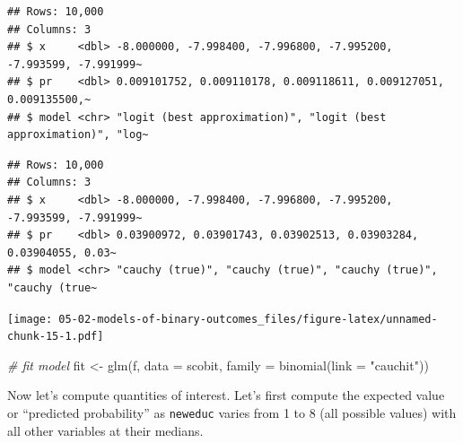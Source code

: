 \documentclass[
]{book}
\newenvironment{Shaded}{\begin{snugshade}}{\end{snugshade}}
\newcommand{\AttributeTok}[1]{\textcolor[rgb]{0.77,0.63,0.00}{#1}}
\newcommand{\CommentTok}[1]{\textcolor[rgb]{0.56,0.35,0.01}{\textit{#1}}}
\newcommand{\FunctionTok}[1]{\textcolor[rgb]{0.00,0.00,0.00}{#1}}
\newcommand{\NormalTok}[1]{#1}
\newcommand{\OtherTok}[1]{\textcolor[rgb]{0.56,0.35,0.01}{#1}}
\newcommand{\StringTok}[1]{\textcolor[rgb]{0.31,0.60,0.02}{#1}}
\begin{document}
\begin{verbatim}
## Rows: 10,000
## Columns: 3
## $ x     <dbl> -8.000000, -7.998400, -7.996800, -7.995200, -7.993599, -7.991999~
## $ pr    <dbl> 0.009101752, 0.009110178, 0.009118611, 0.009127051, 0.009135500,~
## $ model <chr> "logit (best approximation)", "logit (best approximation)", "log~
\end{verbatim}

\begin{verbatim}
## Rows: 10,000
## Columns: 3
## $ x     <dbl> -8.000000, -7.998400, -7.996800, -7.995200, -7.993599, -7.991999~
## $ pr    <dbl> 0.03900972, 0.03901743, 0.03902513, 0.03903284, 0.03904055, 0.03~
## $ model <chr> "cauchy (true)", "cauchy (true)", "cauchy (true)", "cauchy (true~
\end{verbatim}

\texttt{[image: 05-02-models-of-binary-outcomes\_files/figure-latex/unnamed-chunk-15-1.pdf]}

\begin{Shaded}
\begin{Highlighting}[]
\CommentTok{\# fit model}
\NormalTok{fit }\OtherTok{\textless{}{-}} \FunctionTok{glm}\NormalTok{(f, }\AttributeTok{data =}\NormalTok{ scobit, }\AttributeTok{family =} \FunctionTok{binomial}\NormalTok{(}\AttributeTok{link =} \StringTok{"cauchit"}\NormalTok{))}
\end{Highlighting}
\end{Shaded}

Now let's compute quantities of interest. Let's first compute the expected value or ``predicted probability'' as \texttt{neweduc} varies from 1 to 8 (all possible values) with all other variables at their medians.
\end{document}
